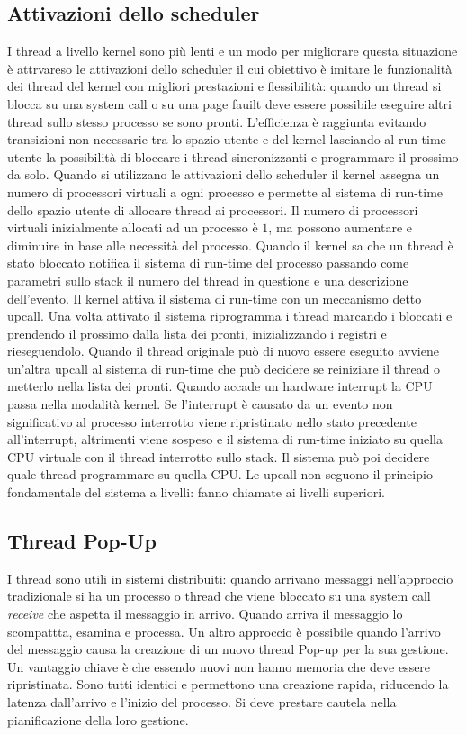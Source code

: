 \subsection{Attivazioni dello scheduler}
I thread a livello kernel sono pi\`u lenti e un modo per migliorare questa situazione \`e attrvareso le attivazioni dello scheduler il cui obiettivo \`e imitare le funzionalit\`a dei
thread del kernel con migliori prestazioni e flessibilit\`a: quando un thread si blocca su una system call o su una page fauilt deve essere possibile eseguire altri thread sullo stesso
processo se sono pronti. L'efficienza \`e raggiunta evitando transizioni non necessarie tra lo spazio utente e del kernel lasciando al run-time utente la possibilit\`a di bloccare i
thread sincronizzanti e programmare il prossimo da solo. Quando si utilizzano le attivazioni dello scheduler il kernel assegna un numero di processori virtuali a ogni processo e permette
al sistema di run-time dello spazio utente di allocare thread ai processori. Il numero di processori virtuali inizialmente allocati ad un processo \`e $1$, ma possono aumentare e 
diminuire in base alle necessit\`a del processo. Quando il kernel sa che un thread \`e stato bloccato notifica il sistema di run-time del processo passando come parametri sullo stack
il numero del thread in questione e una descrizione dell'evento. Il kernel attiva il sistema di run-time con un meccanismo detto upcall. Una volta attivato il sistema riprogramma i 
thread marcando i bloccati e prendendo il prossimo dalla lista dei pronti, inizializzando i registri e rieseguendolo. Quando il thread originale pu\`o di nuovo essere eseguito avviene
un'altra upcall al sistema di run-time che pu\`o decidere se reiniziare il thread o metterlo nella lista dei pronti. Quando accade un hardware interrupt la CPU passa nella modalit\`a
kernel. Se l'interrupt \`e causato da un evento non significativo al processo interrotto viene ripristinato nello stato precedente all'interrupt, altrimenti viene sospeso e il sistema di
run-time iniziato su quella CPU virtuale con il thread interrotto sullo stack. Il sistema pu\`o poi decidere quale thread programmare su quella CPU. Le upcall non seguono il principio
fondamentale del sistema a livelli: fanno chiamate ai livelli superiori. 
\subsection{Thread Pop-Up}
I thread sono utili in sistemi distribuiti: quando arrivano messaggi nell'approccio tradizionale si ha un processo o thread che viene bloccato su una system call \emph{receive} che 
aspetta il messaggio in arrivo. Quando arriva il messaggio lo scompattta, esamina e processa. Un altro approccio \`e possibile quando l'arrivo del messaggio causa la creazione di un
nuovo thread Pop-up per la sua gestione. Un vantaggio chiave \`e che essendo nuovi non hanno memoria che deve essere ripristinata. Sono tutti identici e permettono una creazione rapida, 
riducendo la latenza dall'arrivo e l'inizio del processo. Si deve prestare cautela nella pianificazione della loro gestione.
